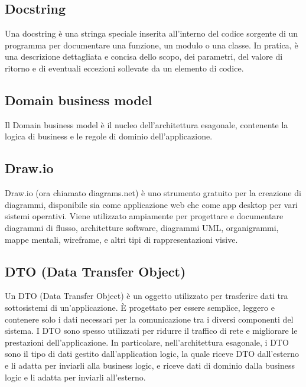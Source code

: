 \hypertarget{sec:docstring}{}
\subsection*{Docstring}
Una docstring è una stringa speciale inserita all'interno del codice sorgente di un programma per documentare una funzione, un modulo 
o una classe. In pratica, è una descrizione dettagliata e concisa dello scopo, dei parametri, del valore di ritorno e di eventuali 
eccezioni sollevate da un elemento di codice.

\hypertarget{sec:domain business model}{}
\subsection*{Domain business model}
Il Domain business model è il nucleo dell'architettura esagonale, contenente la logica di business e le regole di dominio dell'applicazione.


\subsection*{Draw.io}
Draw.io (ora chiamato diagrams.net) è uno strumento gratuito per la creazione di diagrammi, disponibile sia come applicazione web che come app desktop per 
vari sistemi operativi. Viene utilizzato ampiamente per progettare e documentare diagrammi di flusso, architetture software, diagrammi UML, organigrammi, 
mappe mentali, wireframe, e altri tipi di rappresentazioni visive.

\hypertarget{sec:dto}{}
\subsection*{DTO (Data Transfer Object)}
Un DTO (Data Transfer Object) è un oggetto utilizzato per trasferire dati tra sottosistemi di un'applicazione. È progettato per essere semplice, leggero e
contenere solo i dati necessari per la comunicazione tra i diversi componenti del sistema. I DTO sono spesso utilizzati per ridurre il traffico di rete e
migliorare le prestazioni dell'applicazione. In particolare, nell'architettura esagonale, i DTO sono il tipo di dati gestito dall'application logic,
la quale riceve DTO dall'esterno e li adatta per inviarli alla business logic, e riceve dati di dominio dalla business logic e li adatta per inviarli
all'esterno.

\newpage



